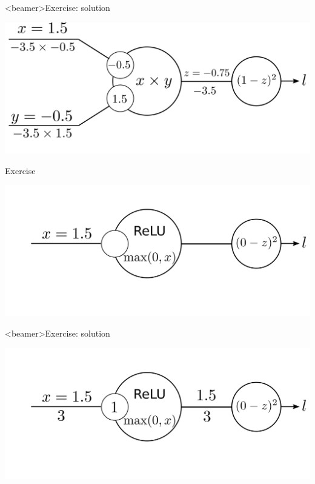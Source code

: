 \documentclass[xcolor=pdftex,dvipsnames,table,mathserif]{beamer}
\begin{document}
\begin{frame}<beamer>{Exercise: solution}

  \includegraphics[width=\textwidth]{bp_2_1_neuron_exo_sol.png}

\end{frame}



\begin{frame}{Exercise}

  \includegraphics[width=\textwidth]{bp_relu_exo.png}

\end{frame}

\begin{frame}<beamer>{Exercise: solution}

  \includegraphics[width=\textwidth]{bp_relu_exo_sol.png}

\end{frame}
\end{document}
